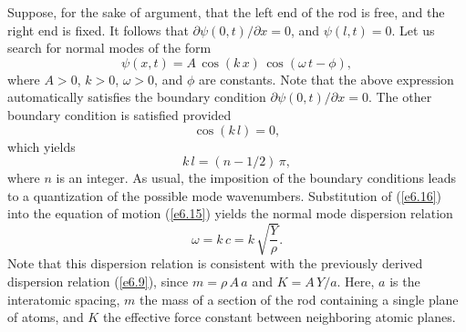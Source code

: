 Suppose, for the sake of argument, that the left end of the rod is free, and the right
end is fixed. It follows that $\partial\psi(0,t)/\partial x=0$, and $\psi(l,t)=0$. 
Let us search for normal modes of the form
\begin{equation}\label{e6.16}
\psi(x,t) = A\,\cos(k\,x)\,\cos(\omega\,t-\phi),
\end{equation}
where $A>0$, $k>0$, $\omega>0$, and $\phi$ are constants. Note that the
above expression automatically satisfies the boundary condition $\partial\psi(0,t)/\partial x=0$. The other boundary condition is satisfied provided 
\begin{equation}
\cos(k\,l) = 0,
\end{equation}
which yields
\begin{equation}
k\,l = (n-1/2)\,\pi,
\end{equation}
where $n$ is an integer. As usual, the imposition of the boundary conditions leads
to a quantization of the possible mode wavenumbers.
Substitution of (\ref{e6.16}) into the equation of motion (\ref{e6.15}) yields the normal mode dispersion relation
\begin{equation}
\omega = k\,c = k\,\sqrt{\frac{Y}{\rho}}.
\end{equation}
Note that this dispersion relation is consistent with the previously derived dispersion relation  (\ref{e6.9}), since $m=\rho\,A\,a$
and $K=A\,Y/a$. Here, $a$ is the interatomic spacing, $m$ the mass of a section
of the rod containing a single plane of atoms, and $K$ the effective force constant
between neighboring atomic planes. 

